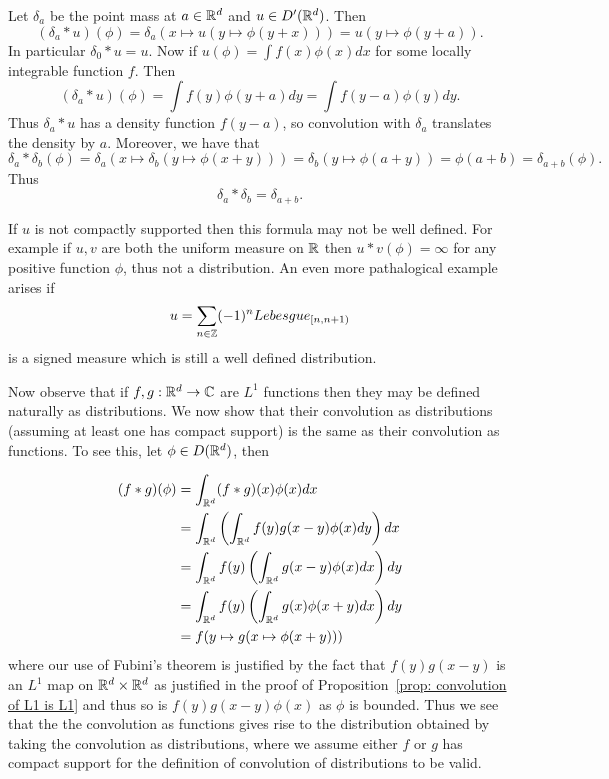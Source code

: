 \documentclass[twoside, a4paper, 10pt]{amsart}
\begin{document}
\begin{eg} Let $\delta_a$ be the point mass at $a \in \mathbb{R}^d$ and $u \in D'(\mathbb{R}^d)$. Then $$(\delta_a * u)(\phi) = \delta_a(x \mapsto u(y \mapsto \phi(y+x))) = u(y \mapsto \phi(y+a)).$$ In particular $\delta_0 * u = u$. Now if $u(\phi) = \int f(x) \phi(x) dx$ for some locally integrable function $f$. Then $$(\delta_a * u)(\phi) = \int f(y)\phi(y+a) dy = \int f(y-a)\phi(y) dy.$$ Thus $\delta_a * u$ has a density function $f(y-a)$, so convolution with $\delta_a$ translates the density by $a$. Moreover, we have that $$\delta_a * \delta_b (\phi) = \delta_a(x \mapsto \delta_b(y \mapsto \phi(x+y))) = \delta_b (y \mapsto \phi(a+y)) = \phi(a+b) = \delta_{a+b}(\phi).$$ Thus $$\delta_a * \delta_b = \delta_{a+b}.$$

\end{eg}


\begin{eg} If $u$ is not compactly supported then this formula may not be well defined. For example if $u,v$ are both the uniform measure on $\mathbb{R}$ then $u*v(\phi) = \infty$ for any positive function $\phi$, thus not a distribution. An even more pathalogical example arises if $$u = \sum_{n \in \mathbb{Z}} (-1)^n Lebesgue_{[n,n+1)}$$ is a signed measure which is still a well defined distribution.

\end{eg}

Now observe that if $f,g:\mathbb{R}^d \to \mathbb{C}$ are $L^1$ functions then they may be defined naturally as distributions. We now show that their convolution as distributions (assuming at least one has compact support) is the same as their convolution as functions. To see this, let $\phi \in D(\mathbb{R}^d)$, then 

\begin{align*} (f * g)(\phi) &= \int_{\mathbb{R}^d} (f*g)(x) \phi(x) dx \\ &= \int_{\mathbb{R}^d} \left( \int_{\mathbb{R}^d} f(y)g(x-y) \phi(x) dy \right) dx \\ &= \int_{\mathbb{R}^d} f(y)  \left( \int_{\mathbb{R}^d} g(x-y)\phi(x) dx \right)  dy \\ &=  \int_{\mathbb{R}^d} f(y)  \left( \int_{\mathbb{R}^d} g(x)\phi(x+y) dx \right)  dy \\ &= f(y \mapsto g(x \mapsto \phi(x+y))) \end{align*} where our use of Fubini's theorem is justified by the fact that $f(y)g(x-y)$ is an $L^1$ map on $\mathbb{R}^d \times \mathbb{R}^d$ as justified in the proof of Proposition~\ref{prop: convolution of L1 is L1} and thus so is $f(y)g(x-y)\phi(x)$ as $\phi$ is bounded. Thus we see that the the convolution as functions gives rise to the distribution obtained by taking the convolution as distributions, where we assume either $f$ or $g$ has compact support for the definition of convolution of distributions to be valid.
\end{document}
